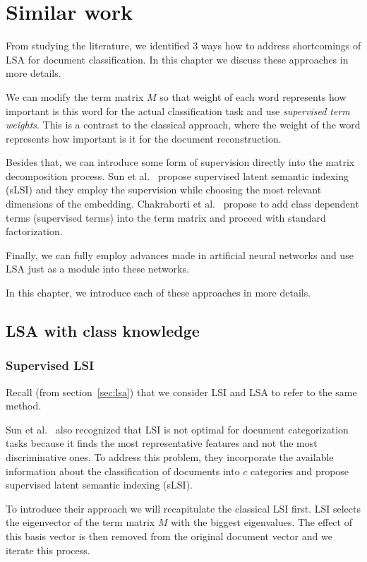 \chapter{Similar work}
From studying the literature, we identified 3 ways how to address shortcomings of LSA for document classification. In this chapter we discuss these approaches in more details.

We can modify the term matrix $M$ so that weight of each word represents how important is this word for the actual classification task and use \emph{supervised term weights}. 
This is a contrast to the classical approach, where the weight of the word represents how important is it for the document reconstruction.

Besides that, we can introduce some form of supervision directly into the matrix decomposition process.
Sun et al.~\cite{sun2004supervised} propose supervised latent semantic indexing (sLSI) and they employ the supervision while choosing the most relevant dimensions of the embedding.
Chakraborti et al.~\cite{chakraborti2006sprinkling} propose to add class dependent terms (supervised terms) into the term matrix and proceed with standard factorization.

Finally, we can fully employ advances made in artificial neural networks and use LSA just as a module into these networks.

In this chapter, we introduce each of these approaches in more details.


\section{LSA with class knowledge} \label{sec:superwisedlsa}
    \subsection{Supervised LSI}
        Recall (from section~\ref{sec:lsa}) that we consider LSI and LSA to refer to the same method. 
    
        Sun et al.~\cite{sun2004supervised} %
        also recognized that LSI is not optimal for document categorization tasks because it finds the most representative features and not the most discriminative ones. 
        To address this problem, they incorporate the available information about the classification of documents into $c$ categories and propose supervised latent semantic indexing (sLSI).
        
        To introduce their approach we will recapitulate the classical LSI first. 
        LSI selects the eigenvector of the term matrix $M$ with the biggest eigenvalues.
        The effect of this basis vector is then removed from the original document vector and we iterate this process. 
        
